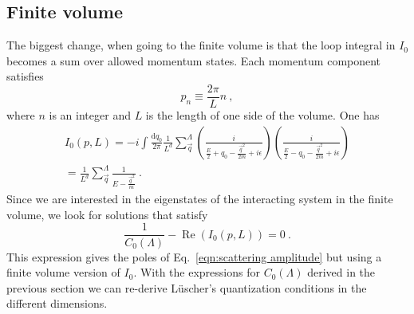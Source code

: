 \documentclass[11pt]{article}
\begin{document}
\subsection{Finite volume}
The biggest change, when going to the finite volume is that the loop integral in $I_0$ becomes a sum over allowed momentum states.  Each momentum component satisfies
\begin{equation}
p_n\equiv \frac{2\pi}{L}n\ ,
\end{equation}
where $n$ is an integer and $L$ is the length of one side of the volume.  One has
\begin{multline}
I_0(p,L)=-i\int \frac { \mathrm {d}q_0}{2\pi} \frac{1}{L^d}\sum_{\vec{q}}^\Lambda \left( \frac { i } { \frac{E}{2} + q _ { 0 } - \frac{\vec{q}^2}{2m} + i \epsilon } \right) \left( \frac { i } { \frac{E}{2} - q _ { 0 } - \frac{\vec{q}^2}{2m} + i \epsilon } \right)\\
=\frac{1}{L^d}\sum_{\vec{q}}^\Lambda \frac { 1 } { E - \frac{\vec{q}^2}{m} } \ .
\end{multline}
Since we are interested in the eigenstates of the interacting system in the finite volume, we look for solutions that satisfy
\begin{equation}\label{eqn:quantization}
\frac { 1 } { C _ { 0 } (\Lambda ) } - \operatorname { Re } \left( I_0(p,L) \right) = 0\ .
\end{equation}
This expression gives the poles of Eq.~\eqref{eqn:scattering amplitude} but using a finite volume version of $I_0$.  With the expressions for $C_0(\Lambda)$ derived in the previous section we can re-derive L\"uscher's quantization conditions in the different dimensions.
\end{document}
